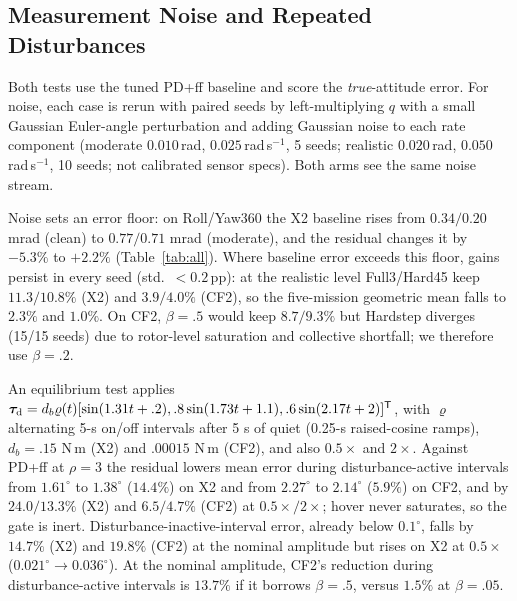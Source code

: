 \documentclass[letterpaper, 10 pt, conference]{ieeeconf}
\newcommand{\T}{^{\mathsf T}}
\begin{document}
\subsection{Measurement Noise and Repeated Disturbances}
\label{sec:noise}
Both tests use the tuned PD+ff baseline and score the \emph{true}-attitude error. For noise, each case is rerun with paired seeds by left-multiplying $q$ with a small Gaussian Euler-angle perturbation and adding Gaussian noise to each rate component (moderate $0.010$\,rad, $0.025$\,rad\,s$^{-1}$, 5 seeds; realistic $0.020$\,rad, $0.050$\,rad\,s$^{-1}$, 10 seeds; not calibrated sensor specs). Both arms see the same noise stream.

Noise sets an error floor: on Roll/Yaw360 the X2 baseline rises from $0.34/0.20$ mrad (clean) to $0.77/0.71$ mrad (moderate), and the residual changes it by $-5.3\%$ to $+2.2\%$ (Table~\ref{tab:all}). Where baseline error exceeds this floor, gains persist in every seed (std.\ $<0.2$\,pp): at the realistic level Full3/Hard45 keep $11.3/10.8\%$ (X2) and $3.9/4.0\%$ (CF2), so the five-mission geometric mean falls to $2.3\%$ and $1.0\%$. On CF2, $\beta=.5$ would keep $8.7/9.3\%$ but Hardstep diverges (15/15 seeds) due to rotor-level saturation and collective shortfall; we therefore use $\beta=.2$.

\label{sec:disturbance}

An equilibrium test applies $\bm\tau_{\rm d}=d_b\varrho(t)[\sin(1.31t+.2),\allowbreak .8\sin(1.73t+1.1),\allowbreak.6\sin(2.17t+2)]\T$, with $\varrho$ alternating 5-s on/off intervals after 5 s of quiet (0.25-s raised-cosine ramps), $d_b=.15$ N\,m (X2) and $.00015$ N\,m (CF2), and also $0.5\times$ and $2\times$. Against PD+ff at $\rho=3$ the residual lowers mean error during disturbance-active intervals from $1.61^\circ$ to $1.38^\circ$ ($14.4\%$) on X2 and from $2.27^\circ$ to $2.14^\circ$ ($5.9\%$) on CF2, and by $24.0/13.3\%$ (X2) and $6.5/4.7\%$ (CF2) at $0.5\times/2\times$; hover never saturates, so the gate is inert. Disturbance-inactive-interval error, already below $0.1^\circ$, falls by $14.7\%$ (X2) and $19.8\%$ (CF2) at the nominal amplitude but rises on X2 at $0.5\times$ ($0.021^\circ\to0.036^\circ$). At the nominal amplitude, CF2's reduction during disturbance-active intervals is $13.7\%$ if it borrows $\beta=.5$, versus $1.5\%$ at $\beta=.05$.

\end{document}
